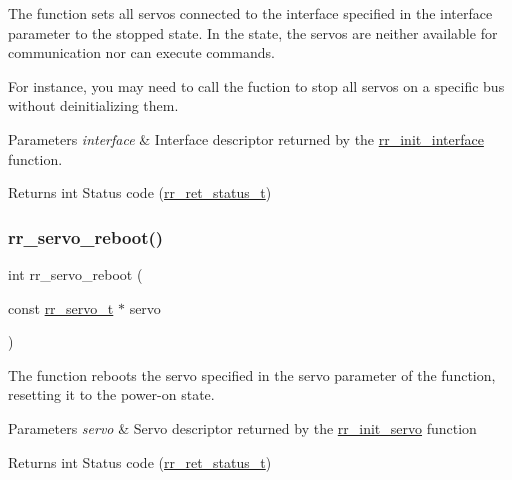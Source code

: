 The function sets all servos connected to the interface specified in the \textquotesingle{}interface\textquotesingle{} parameter to the stopped state. In the state, the servos are neither available for communication nor can execute commands. 

For instance, you may need to call the fuction to stop all servos on a specific bus without deinitializing them.


\begin{DoxyParams}{Parameters}
{\em interface} & Interface descriptor returned by the \hyperlink{group___init_ga472a4890dcc7d7a13123c56a06946d91}{rr\+\_\+init\+\_\+interface} function. \\
\hline
\end{DoxyParams}
\begin{DoxyReturn}{Returns}
int Status code (\hyperlink{api_8h_a92d5be5038abcf89837faf85a08debdc}{rr\+\_\+ret\+\_\+status\+\_\+t}) 
\end{DoxyReturn}
\mbox{\label{group___state_ga1239a8f4a80ea1c33f599a0cdc58048c}} 
\subsubsection{\texorpdfstring{rr\+\_\+servo\+\_\+reboot()}{rr\_servo\_reboot()}}
{\footnotesize\ttfamily int rr\+\_\+servo\+\_\+reboot (\begin{DoxyParamCaption}\item[{const \hyperlink{structrr__servo__t}{rr\+\_\+servo\+\_\+t} $\ast$}]{servo }\end{DoxyParamCaption})}



The function reboots the servo specified in the \textquotesingle{}servo\textquotesingle{} parameter of the function, resetting it to the power-\/on state. 


\begin{DoxyParams}{Parameters}
{\em servo} & Servo descriptor returned by the \hyperlink{group___init_ga0adb313a3eeb8a4399431e940a1f3e9e}{rr\+\_\+init\+\_\+servo} function \\
\hline
\end{DoxyParams}
\begin{DoxyReturn}{Returns}
int Status code (\hyperlink{api_8h_a92d5be5038abcf89837faf85a08debdc}{rr\+\_\+ret\+\_\+status\+\_\+t}) 
\end{DoxyReturn}
\mbox{\label{group___state_ga59060b95f6ee0614cbec3500ba08b7a0}} 
